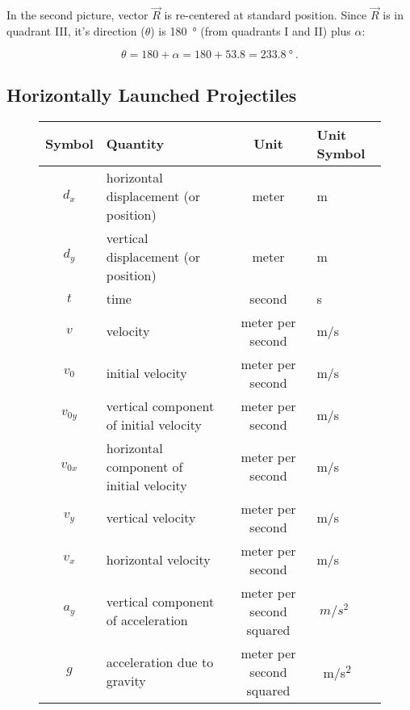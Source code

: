 \documentclass{article}
\begin{document}
In the second picture, vector $\vec{R}$ is re-centered at standard position. Since $\vec{R}$ is in quadrant III, it's direction ($\theta$) is \SI{180}{\degree} (from quadrants I and II) plus $\alpha$:

\begin{equation*}
    \theta = 180 + \alpha = 180 + 53.8 = \SI{233.8}{\degree}\ .
\end{equation*}


\subsection{Horizontally Launched Projectiles}

\begin{figure}[h!]
    \centering
    \begin{tabular}{cl|cl}
    \hline
    \textbf{Symbol} & \textbf{Quantity} & \textbf{Unit} & \textbf{Unit Symbol}  \\
    \hline\hline
        $d_x$ & horizontal displacement (or position) & meter & m\\
        $d_y$ & vertical displacement (or position) & meter & m\\
        $t$ & time & second & s\\
        $v$ & velocity & meter per second & m/s\\
        $v_0$ & initial velocity & meter per second & m/s\\
        $v_{0y}$ & vertical component of initial velocity & meter per second & m/s\\
        $v_{0x}$ & horizontal component of initial velocity & meter per second & m/s\\
        $v_y$ & vertical velocity & meter per second & m/s\\
        $v_x$ & horizontal velocity & meter per second & m/s\\
        $a_y$ & vertical component of acceleration & meter per second squared & $\SI{}{m/s^2}$\\
        $g$ & acceleration due to gravity & meter per second squared & \SI{}{m/s^2}\\
    \hline
    \end{tabular}
    \label{fig:my_label}
\end{figure}
\end{document}
